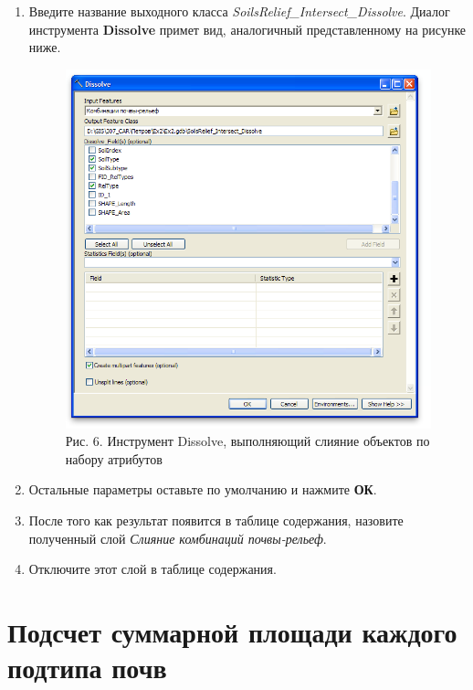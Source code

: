 \documentclass[12pt,]{book}
\begin{document}
\begin{enumerate}
\def\labelenumi{\arabic{enumi}.}
\setcounter{enumi}{3}
\item
  Введите название выходного класса \emph{SoilsRelief\_Intersect\_Dissolve}. Диалог инструмента \textbf{Dissolve} примет вид, аналогичный представленному на рисунке ниже.

  \begin{figure}
  \centering
  \includegraphics{images/Ex10/image10.png}
  \caption{Рис. 6. Инструмент Dissolve, выполняющий слияние объектов по набору атрибутов}
  \end{figure}
\item
  Остальные параметры оставьте по умолчанию и нажмите \textbf{ОК}.
\item
  После того как результат появится в таблице содержания, назовите полученный слой \emph{Слияние комбинаций почвы-рельеф}.
\item
  Отключите этот слой в таблице содержания.
\end{enumerate}

\hypertarget{overlay-sumarea-subtypes}{%
\section{Подсчет суммарной площади каждого подтипа почв}\label{overlay-sumarea-subtypes}}
\end{document}
